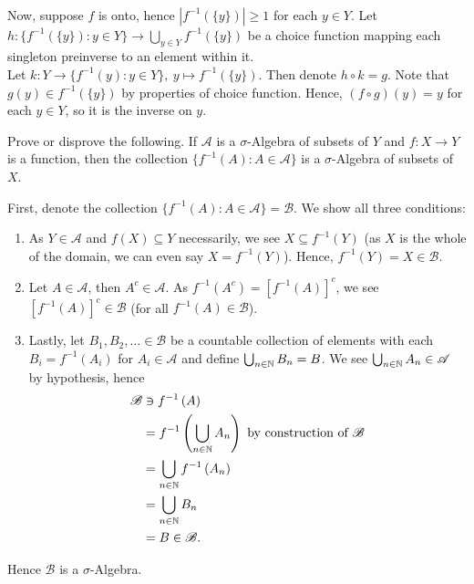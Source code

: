 \documentclass[a4paper]{article}
\begin{document}
\begin{solution}
\begin{enumerate}
\\
Now, suppose \(f\) is onto, hence \(\left| f^{-1}\left( \{y\}  \right)  \right| \ge 1\) for each \(y \in Y\). Let \(h : \{f^{-1}\left(\{y\}\right) : y \in Y\} \to \bigcup_{y \in Y} f^{-1}\left( \{y\}  \right) \) be a choice function mapping each singleton preinverse to an element within it. \\Let \(k : Y \to \{f^{-1}\left( y \right) : y \in Y\}, \ y \mapsto f^{-1}\left( \{y\}  \right) \). Then denote  \(h \circ k = g \). Note that \(g\left( y \right) \in f^{-1}\left( \{y\}  \right)  \) by properties of choice function. Hence, \(\left(f \circ g \right)\left( y \right) = y\) for each \(y \in Y\), so it is the inverse on \(y\).
	\end{enumerate}
\end{solution}
\newpage
\begin{problem}[4]
	Prove or disprove the following. If \(\mathscr{A}\) is a \(\sigma\)-Algebra of subsets of \(Y\) and \(f: X \to Y\) is a function, then the collection \(\{f^{-1} \left( A \right) : A \in \mathscr{A}\} \) is a \(\sigma\)-Algebra of subsets of \(X\).
\end{problem}
\begin{solution}
	First, denote the collection \(\{f^{-1}\left( A \right) : A \in \mathscr{A}\} = \mathscr{B}\). We show all three conditions:
	\begin{enumerate}
		\item As \(Y \in \mathscr{A}\) and \(f\left( X \right) \subseteq Y\) necessarily, we see \(X \subseteq f^{-1} \left( Y \right) \) (as \(X\) is the whole of the domain, we can even say \(X = f^{-1}\left( Y \right) \)). Hence, \(f^{-1}\left( Y \right) = X \in \mathscr{B}\).
		\item Let \(A \in \mathscr{A}\), then \(A^{c} \in \mathscr{A}\). As \(f^{-1}\left( A^{c} \right) = \left[ f^{-1}\left( A \right)  \right] ^{c} \), we see \(\left[ f^{-1}\left( A \right)  \right] ^{c} \in \mathscr{B}\) (for all \(f^{-1}\left( A \right) \in \mathscr{B}\)).
		\item Lastly, let \(B_1, B_2, \ldots \in \mathscr{B}\) be a countable collection of elements with each \(B_{i} = f^{-1}\left( A_{i} \right) \) for \(A_{i} \in \mathscr{A}\) and define \(\bigcup_{n \in \mathbb{N}} B_{n} = B\). We see \(\bigcup_{n \in \mathbb{N}} A_{n} \in \mathscr{A}\) by hypothesis, hence
			\begin{align*}
				\mathscr{B} &\ni f^{-1}\left( A \right) \\
				&= f^{-1}\left( \bigcup_{n \in \mathbb{N}} A_{n} \right) \text{ by construction of \(\mathscr{B}\)}\\
					    &= \bigcup_{n \in \mathbb{N}} f^{-1}\left( A_{n} \right)  \\
					    &= \bigcup_{n\in \mathbb{N}} B_{n} \\
					    &= B \in \mathscr{B}
			.\end{align*}
	\end{enumerate}
	Hence \(\mathscr{B}\) is a \(\sigma\)-Algebra.
\end{solution}
\end{document}
